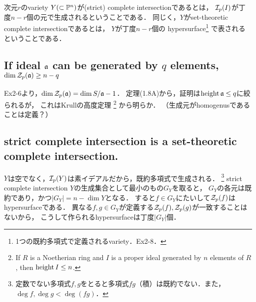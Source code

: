 \documentclass[a4paper]{jsarticle}
\begin{document}
\section{ } %
    次元$r$のvariety $Y (\subset \mathbb{P}^n)$が(strict) complete intersectionであるとは，
    $\mathcal{I}_p(I)$が丁度$n-r$個の元で生成されるということである．
    同じく，$Y$がset-theoretic complete intersectionであるとは，
    $Y$が丁度$n-r$個の
    hypersurface\footnote{1つの既約多項式で定義されるvariety．Ex2-8．}
    で表されるということである．

    \subsection{If ideal $\mathfrak{a}$ can be generated by $q$ elements, $\dim \mathcal{Z}_p(\mathfrak{a}) \geq n-q$}
    Ex2-6より，$\dim \mathcal{Z}_p(\mathfrak{a})=\dim S/\mathfrak{a}-1$．
    定理(1.8A)から，証明は$\operatorname{height} \mathfrak{a} \leq q$に絞られるが，
    これはKrullの高度定理
    \footnote{If $R$ is a Noetherian ring and $I$ is a proper ideal generated by $n$ elements of $R$, then $\operatorname{height} I \leq n$.}
    から明らか．
    （生成元がhomogenusであることは定義？）

    \subsection{strict complete intersection is a set-theoretic complete intersection.}
    $Y$は空でなく，$\mathcal{I}_p(Y)$は素イデアルだから，既約多項式で生成される．
    \footnote{定数でない多項式$f,g$をとると多項式$fg$（積）は既約でない．また，$\deg f, \deg g < \deg (fg)$．}
    strict complete intersection $Y$の生成集合として最小のもの$G_Y$を取ると，
    $G_Y$の各元は既約であり，かつ$|G_Y|=n-\dim Y$となる．
    すると$f \in G_Y$にたいして$\mathcal{Z}_p(f)$はhypersurfaceである．
    異なる$f,g \in G_Y$が定義する$\mathcal{Z}_p(f), \mathcal{Z}_p(g)$が一致することはないから，
    こうして作られるhypersurfaceは丁度$|G_Y|$個．
\end{document}
